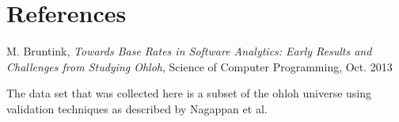 \section{References}

\begingroup
\renewcommand{\section}[2]{}%

\begin{thebibliography}{99}

		M. Bruntink, \emph{Towards Base Rates in Software Analytics: Early Results
		and Challenges from Studying Ohloh}, Science of Computer Programming, Oct.
		2013
		
		The data set that was collected here is a subset of the ohloh universe using
		validation techniques as described by Nagappan et al.

\end{thebibliography}

\endgroup